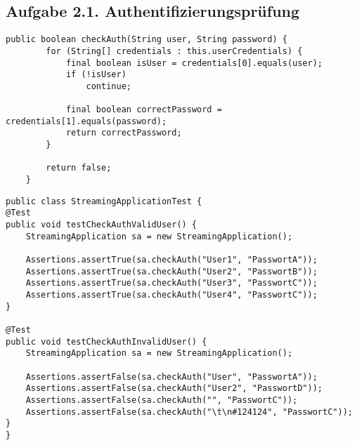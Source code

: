 \subsection*{Aufgabe 2.1. Authentifizierungsprüfung}

\begin{lstlisting}[style=javastyle]
public boolean checkAuth(String user, String password) {
        for (String[] credentials : this.userCredentials) {
            final boolean isUser = credentials[0].equals(user);
            if (!isUser)
                continue;

            final boolean correctPassword = credentials[1].equals(password);
            return correctPassword;
        }

        return false;
    }
\end{lstlisting}

\begin{lstlisting}[style=javastyle]
public class StreamingApplicationTest {
@Test
public void testCheckAuthValidUser() {
    StreamingApplication sa = new StreamingApplication();

    Assertions.assertTrue(sa.checkAuth("User1", "PasswortA"));
    Assertions.assertTrue(sa.checkAuth("User2", "PasswortB"));
    Assertions.assertTrue(sa.checkAuth("User3", "PasswortC"));
    Assertions.assertTrue(sa.checkAuth("User4", "PasswortC"));
}

@Test
public void testCheckAuthInvalidUser() {
    StreamingApplication sa = new StreamingApplication();

    Assertions.assertFalse(sa.checkAuth("User", "PasswortA"));
    Assertions.assertFalse(sa.checkAuth("User2", "PasswortD"));
    Assertions.assertFalse(sa.checkAuth("", "PasswortC"));
    Assertions.assertFalse(sa.checkAuth("\t\n#124124", "PasswortC"));
}
}
\end{lstlisting}